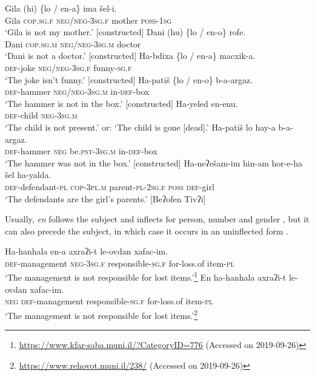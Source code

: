 \documentclass[output=paper,colorlinks,citecolor=brown]{langscibook}
\begin{document}
\ea\label{ex:heb:8}
    \ea\label{ex:heb:8a}
        \gll Gila (hi) {\{lo / en-a\}} ima šel-i.\\
            Gila \textsc{cop.sg.f} \textsc{neg/neg-3sg.f} mother \textsc{poss-1sg}\\
        \glt ‘Gila is not my mother.’ [constructed]
    \ex\label{ex:heb:8b}
        \gll Dani (hu) {\{lo / en-o\}} rofe.\\
             Dani \textsc{cop.sg.m} \textsc{neg/neg-3sg.m} doctor\\
        \glt ‘Dani is not a doctor.’ [constructed]
    \ex\label{ex:heb:8c}
        \gll Ha-bdixa {\{lo / en-a\}} macxik-a.\\
             \textsc{def{}-}joke \textsc{neg/neg-3sg.f} funny-\textsc{sg.f}\\
        \glt ‘The joke isn’t funny.’ [constructed]
    \ex\label{ex:heb:8d}
        \gll Ha-patiš {\{lo / en-o\}} b-a-argaz.\\
             \textsc{def-}hammer \textsc{neg/neg-3sg.m} in\textsc{{}-def}{}-box\\
        \glt ‘The hammer is not in the box.’ [constructed]
    \ex\label{ex:heb:8e}
        \gll Ha-yeled en-enu.\\
             \textsc{def-}child \textsc{neg-3sg.m}\\
        \glt ‘The child is not present.’ or: ‘The child is gone [dead].’ \citep[181]{Tzivoni1993}
    \ex\label{ex:heb:8f}
        \gll Ha-patiš lo hay-a b-a-argaz.\\
             \textsc{def-}hammer \textsc{neg} be.\textsc{pst{}-3sg.m} in\textsc{{}-def}{}-box\\
        \glt ‘The hammer was not in the box.’ [constructed]
    \ex\label{ex:heb:8g}
        \gll Ha-neʔešam-im hin-am hor{}-e{}-ha šel ha-yalda.\\
             \textsc{def-}defendant-\textsc{pl} \textsc{cop{}-3pl.m} parent-\textsc{pl-2sg.f} \textsc{poss} \textsc{def-}girl\\
        \glt ‘The defendants are the girl’s parents.’ [Beʔofen Tivʔi]
    \z 
\z 

Usually, \textit{en} follows the subject and inflects for person, number and gender , but it can also precede the subject, in which case it occurs in an uninflected form  \citep[211]{Tzivoni1993}.

\ea\label{ex:heb:9}
    \ea\label{ex:heb:9a}
        \gll Ha-hanhala en-a axraʔi-t le-ovdan xafac-im.\\
             \textsc{def}{}-management \textsc{neg-3sg.f} responsible-\textsc{sg}.\textsc{f} for-loss.of item-\textsc{pl}\\
        \glt ‘The management is not responsible for lost items.’\footnote{\url{https://www.kfar-saba.muni.il/?CategoryID=776} (Accessed on 2019-09-26)}
    \ex\label{ex:heb:9b}
        \gll En ha-hanhala axraʔi-t le-ovdan xafac-im.\\
             \textsc{neg} \textsc{def}{}-management responsible-\textsc{sg}.\textsc{f}  for-loss.of item-\textsc{pl}\\
        \glt ‘The management is not responsible for lost items.’\footnote{\url{https://www.rehovot.muni.il/238/} (Accessed on 2019-09-26)}
    \z 
\z
\end{document}
